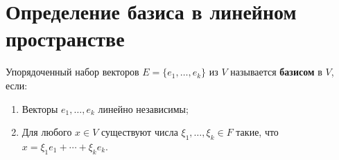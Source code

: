 \section{Определение базиса в линейном пространстве}

\begin{definition}
Упорядоченный набор векторов $E = \{e_1, \ldots, e_k\}$ из $V$ называется \textbf{базисом} в $V$, если:
\begin{enumerate}
    \item Векторы $e_1, \ldots, e_k$ линейно независимы;
    \item Для любого $x \in V$ существуют числа $\xi_1, \ldots, \xi_k \in F$ такие, что $x = \xi_1 e_1 + \cdots + \xi_k e_k$.
\end{enumerate}
\end{definition}
